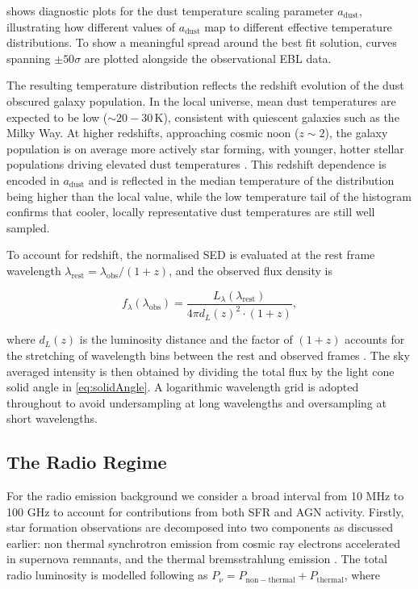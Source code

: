 \documentclass[
    a4paper, %
    10pt, %
    unnumberedsections, %
]{LTJournalArticle}
\begin{document}
 shows diagnostic plots for the dust temperature scaling parameter $a_\mathrm{dust}$, illustrating how different values of $a_\mathrm{dust}$ map to different effective temperature distributions. To show a meaningful spread around the best fit solution, curves spanning $\pm50\sigma$ are plotted alongside the observational EBL data.

The resulting temperature distribution reflects the redshift evolution of the dust obscured galaxy population. In the local universe, mean dust temperatures are expected to be low ($\sim20-30$\,K), consistent with quiescent galaxies such as the Milky Way. At higher redshifts, approaching cosmic noon ($z \sim 2$), the galaxy population is on average more actively star forming, with younger, hotter stellar populations driving elevated dust temperatures \parencite{parenteDriversCosmicDust2026}. This redshift dependence is encoded in $a_\mathrm{dust}$ and is reflected in the median temperature of the distribution being higher than the local value, while the low temperature tail of the histogram confirms that cooler, locally representative dust temperatures are still well sampled.

To account for redshift, the normalised SED is evaluated at the rest frame wavelength $\lambda_\mathrm{rest} = \lambda_\mathrm{obs}/(1+z)$, and the observed flux density is

\begin{equation}
    f_\lambda(\lambda_{\mathrm{obs}}) =
    \frac{L_\lambda(\lambda_{\mathrm{rest}})}{4\pi d_L(z)^2 \cdot (1+z)},
    \label{eq:luminosityDistanceRelation}
\end{equation}

\noindent where $d_L(z)$ is the luminosity distance and the factor of $(1+z)$ accounts for the stretching of wavelength bins between the rest and observed frames \parencite{hoggDistanceMeasuresCosmology2000,gabrielliStatisticalPhysicsCosmic2005}. The sky averaged intensity is then obtained by dividing the total flux by the light cone solid angle in \cref{eq:solidAngle}. A logarithmic wavelength grid is adopted throughout to avoid undersampling at long wavelengths and oversampling at short wavelengths.

\subsection{The Radio Regime}

For the radio emission background we consider a broad interval from 10 MHz to 100 GHz to account for contributions from both SFR and AGN activity. Firstly, star formation observations are decomposed into two components as discussed earlier: non thermal synchrotron emission from cosmic ray electrons accelerated in supernova remnants, and the thermal bremsstrahlung emission \cite{condonRadioEmissionNormal1992}. The total radio luminosity is modelled following \cite{thomasRadioGalaxyPopulation2021} as $P_\nu = P_\mathrm{non-thermal} + P_\mathrm{thermal}$, where
\end{document}
